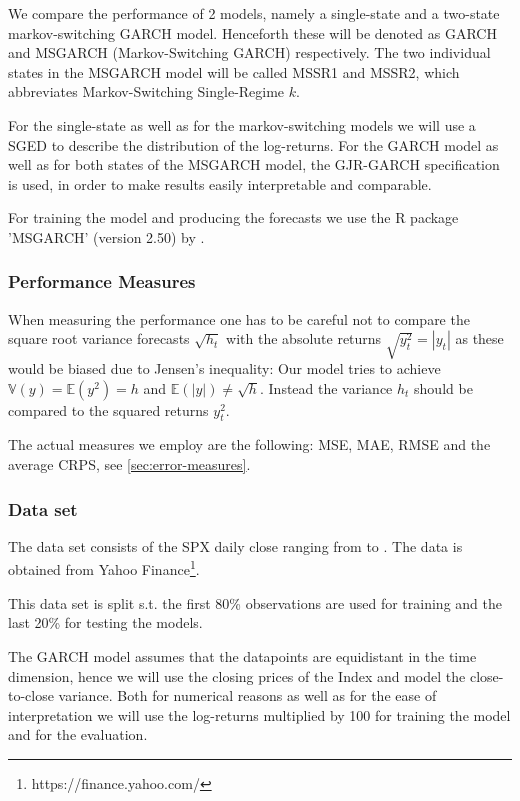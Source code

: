 \documentclass[11pt,a4paper]{article}
\begin{document}
We compare the performance of 2 models, namely a single-state and a two-state markov-switching GARCH model. Henceforth these will be denoted as GARCH and MSGARCH (Markov-Switching GARCH) respectively. The two individual states in the MSGARCH model will be called MSSR1 and MSSR2, which abbreviates Markov-Switching Single-Regime $k$.

For the single-state as well as for the markov-switching models we will use a \ac{SGED} to describe the distribution of the log-returns.
For the GARCH model as well as for both states of the MSGARCH model, the GJR-GARCH specification is used, in order to make results easily interpretable and comparable.

For training the model and producing the forecasts we use the R package 'MSGARCH' (version 2.50) by \cite{ardia_markov-switching_2019}.

\subsubsection{Performance Measures}
When measuring the performance one has to be careful not to compare the square root variance forecasts $\sqrt{h_t}$ with the absolute returns $\sqrt{y_t^2} = | y_t |$ as these would be biased due to Jensen's inequality: Our model tries to achieve $\mathbb{V}(y) =\mathbb{E}(y^2) = h$ and $\mathbb{E}(| y |) \neq \sqrt{h}$. Instead the variance $h_t$ should be compared to the squared returns $y_t^2$.

The actual measures we employ are the following: \ac{MSE}, \ac{MAE}, \ac{RMSE} and the average \ac{CRPS}, see \cref{sec:error-measures}.

\subsubsection{Data set}
The data set consists of the SPX daily close ranging from  to . The data is obtained from Yahoo Finance\footnote{https://finance.yahoo.com/}.

This data set is split s.t. the first 80\% observations are used for training and the last 20\% for testing the models.

The GARCH model assumes that the datapoints are equidistant in the time dimension, hence we will use the closing prices of the Index and model the close-to-close variance. Both for numerical reasons as well as for the ease of interpretation we will use the log-returns multiplied by 100 for training the model and for the evaluation.
\end{document}
